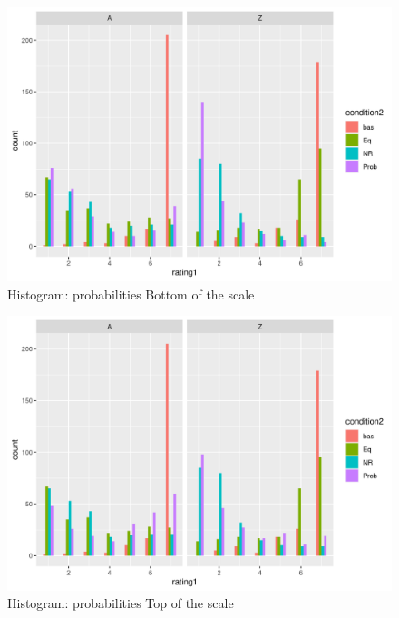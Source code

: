 \documentclass[
  letterpaper,
  DIV=11,
  numbers=noendperiod]{scrartcl}
\begin{document}
\begin{figure}

{\centering \includegraphics{"histogram_faceted_prob_bott.png"}

}

\caption{Histogram: probabilities Bottom of the scale}

\end{figure}

\begin{figure}

{\centering \includegraphics{"histogram_faceted_prob_top.png"}

}

\caption{Histogram: probabilities Top of the scale}

\end{figure}
\end{document}
